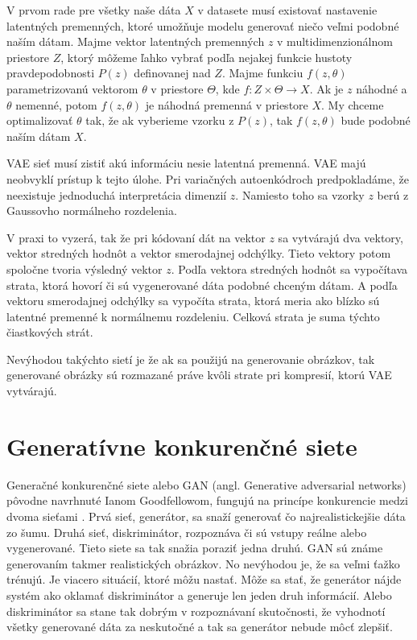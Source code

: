 V prvom rade pre všetky naše dáta \(X\) v datasete musí existovať nastavenie latentných premenných, ktoré umožňuje modelu generovať niečo veľmi podobné naším dátam.
Majme vektor latentných premenných \(z\) v multidimenzionálnom priestore \(Z\), ktorý môžeme ľahko vybrať podľa nejakej funkcie hustoty pravdepodobnosti \(P(z)\) definovanej nad \(Z\).
Majme funkciu \(f(z, \theta)\) parametrizovanú vektorom \(\theta\) v priestore \(\Theta\), kde \(f: Z \times \Theta \rightarrow X\).
Ak je \(z\) náhodné a \(\theta\) nemenné, potom \(f(z, \theta)\) je náhodná premenná v priestore \(X\).
My chceme optimalizovať \(\theta\) tak, že ak vyberieme vzorku z \(P(z)\), tak \(f(z, \theta)\) bude podobné naším dátam \(X\).

VAE sieť musí zistiť akú informáciu nesie latentná premenná.
VAE majú neobvyklí prístup k tejto úlohe.
Pri variačných autoenkódroch predpokladáme, že neexistuje jednoduchá interpretácia dimenzií \(z\).
Namiesto toho sa vzorky \(z\) berú z Gaussovho normálneho rozdelenia.

V praxi to vyzerá, tak že pri kódovaní dát na vektor \(z\) sa vytvárajú dva vektory, vektor stredných hodnôt a vektor smerodajnej odchýlky.
Tieto vektory potom spoločne tvoria výsledný vektor \(z\).
Podľa vektora stredných hodnôt sa vypočítava strata, ktorá hovorí či sú vygenerované dáta podobné chceným dátam.
A podľa vektoru smerodajnej odchýlky sa vypočíta strata, ktorá meria ako blízko sú latentné premenné k normálnemu rozdeleniu.
Celková strata je suma týchto čiastkových strát.

Nevýhodou takýchto sietí je že ak sa použijú na generovanie obrázkov, tak generované obrázky sú rozmazané práve kvôli strate pri kompresií, ktorú VAE vytvárajú.

\section{Generatívne konkurenčné siete}
Generačné konkurenčné siete alebo GAN (angl. Generative adversarial networks) pôvodne navrhnuté Ianom Goodfellowom, fungujú na princípe konkurencie medzi dvoma sieťami \cite{GAN}.
Prvá sieť, generátor, sa snaží generovať čo najrealistickejšie dáta zo šumu.
Druhá sieť, diskriminátor,  rozpoznáva či sú vstupy reálne alebo vygenerované.
Tieto siete sa tak snažia poraziť jedna druhú.
GAN sú známe generovaním takmer realistických obrázkov.
No nevýhodou je, že sa veľmi ťažko trénujú. Je viacero situácií, ktoré môžu nastať. Môže sa stať, že generátor nájde systém ako oklamať diskriminátor a generuje len jeden druh informácií.
Alebo diskriminátor sa stane tak dobrým v rozpoznávaní skutočnosti, že vyhodnotí všetky generované dáta za neskutočné a tak sa generátor nebude môcť zlepšiť.

